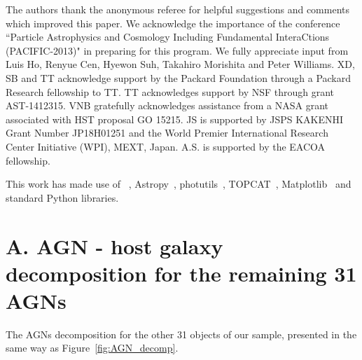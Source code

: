 \documentclass[apj]{emulateapj}
\begin{document}
The authors thank the anonymous referee for helpful suggestions and comments which improved this paper. We acknowledge the importance of the conference ``Particle Astrophysics and Cosmology Including Fundamental InteraCtions (PACIFIC-2013)" in preparing for this program. We fully appreciate input from Luis Ho, Renyue Cen, Hyewon Suh, Takahiro Morishita and Peter Williams. XD, SB and TT acknowledge support by the Packard Foundation through a Packard Research fellowship to TT. TT acknowledges support by NSF through grant AST-1412315. VNB gratefully acknowledges assistance from a NASA grant associated with HST proposal GO 15215. JS is supported by JSPS KAKENHI Grant Number JP18H01251 and the World Premier International Research Center Initiative (WPI), MEXT, Japan. A.S. is supported by the EACOA fellowship.


This work has made use of \lenstronomy~\citep{lenstronomy}, {\sc Astropy}~\citep{Astropy}, {\sc photutils}~\citep{photutils}, {\sc TOPCAT}~\citep{TOPCAT}, {\sc Matplotlib}~\citep{Matplotlib} %
and standard Python libraries.


%


\newpage

\appendix

\section{A. AGN - host galaxy decomposition for the remaining 31 AGNs}\label{sec:restsample}
The AGNs decomposition for the other 31 objects of our sample, presented in the same way as Figure~\ref{fig:AGN_decomp}.
\end{document}
